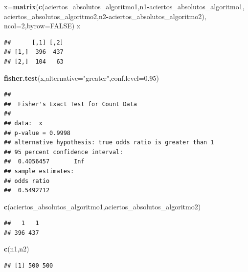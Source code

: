 \documentclass[
]{article}
\newenvironment{Shaded}{\begin{snugshade}}{\end{snugshade}}
\newcommand{\DataTypeTok}[1]{\textcolor[rgb]{0.13,0.29,0.53}{#1}}
\newcommand{\DecValTok}[1]{\textcolor[rgb]{0.00,0.00,0.81}{#1}}
\newcommand{\FloatTok}[1]{\textcolor[rgb]{0.00,0.00,0.81}{#1}}
\newcommand{\KeywordTok}[1]{\textcolor[rgb]{0.13,0.29,0.53}{\textbf{#1}}}
\newcommand{\NormalTok}[1]{#1}
\newcommand{\OperatorTok}[1]{\textcolor[rgb]{0.81,0.36,0.00}{\textbf{#1}}}
\newcommand{\OtherTok}[1]{\textcolor[rgb]{0.56,0.35,0.01}{#1}}
\newcommand{\StringTok}[1]{\textcolor[rgb]{0.31,0.60,0.02}{#1}}
\begin{document}
\begin{Shaded}
\begin{Highlighting}[]
\NormalTok{x=}\KeywordTok{matrix}\NormalTok{(}\KeywordTok{c}\NormalTok{(aciertos\_absolutos\_algoritmo1,n1}\OperatorTok{{-}}\NormalTok{aciertos\_absolutos\_algoritmo1,}
\NormalTok{           aciertos\_absolutos\_algoritmo2,n2}\OperatorTok{{-}}\NormalTok{aciertos\_absolutos\_algoritmo2),}
         \DataTypeTok{ncol=}\DecValTok{2}\NormalTok{,}\DataTypeTok{byrow=}\OtherTok{FALSE}\NormalTok{)}
\NormalTok{x}
\end{Highlighting}
\end{Shaded}

\begin{verbatim}
##      [,1] [,2]
## [1,]  396  437
## [2,]  104   63
\end{verbatim}

\begin{Shaded}
\begin{Highlighting}[]
\KeywordTok{fisher.test}\NormalTok{(x,}\DataTypeTok{alternative=}\StringTok{"greater"}\NormalTok{,}\DataTypeTok{conf.level=}\FloatTok{0.95}\NormalTok{)}
\end{Highlighting}
\end{Shaded}

\begin{verbatim}
## 
##  Fisher's Exact Test for Count Data
## 
## data:  x
## p-value = 0.9998
## alternative hypothesis: true odds ratio is greater than 1
## 95 percent confidence interval:
##  0.4056457       Inf
## sample estimates:
## odds ratio 
##  0.5492712
\end{verbatim}

\begin{Shaded}
\begin{Highlighting}[]
\KeywordTok{c}\NormalTok{(aciertos\_absolutos\_algoritmo1,aciertos\_absolutos\_algoritmo2)}
\end{Highlighting}
\end{Shaded}

\begin{verbatim}
##   1   1 
## 396 437
\end{verbatim}

\begin{Shaded}
\begin{Highlighting}[]
\KeywordTok{c}\NormalTok{(n1,n2)}
\end{Highlighting}
\end{Shaded}

\begin{verbatim}
## [1] 500 500
\end{verbatim}
\end{document}
